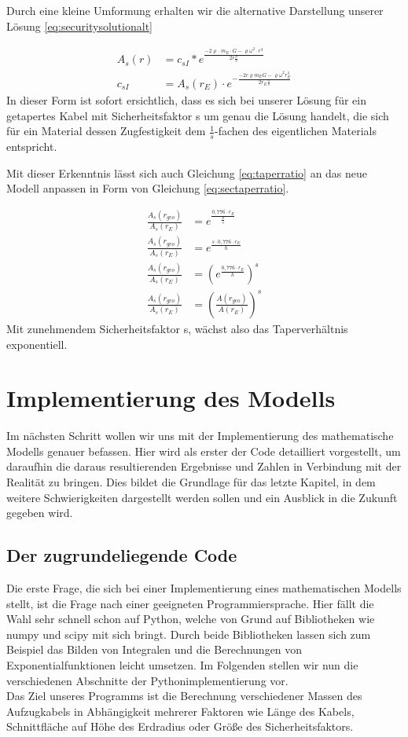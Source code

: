 \documentclass[a4paper, 10pt]{report}
\begin{document}
Durch eine kleine Umformung erhalten wir die alternative Darstellung unserer Lösung \ref{eq:securitysolutionalt}

\begin{align}
A_s(r) &= c_{sI} * e^{\frac{-2\varrho \cdot m_E \cdot G - \varrho \omega^2 \cdot r^3}{2 r \frac{\sigma}{s}}}\label{eq:securitysolutionalt}\\
c_{sI} &= A_s(r_E) \cdot e^{- \frac{-2 c \varrho m_E G - \varrho \omega^2 r_E^3}{2 r_E \frac{\sigma}{s}}}
\label{eq:securityconstantalt}
\end{align}
In dieser Form ist sofort ersichtlich, dass es sich bei unserer Lösung für ein getapertes Kabel mit Sicherheitsfaktor s um genau die Lösung handelt, die sich für ein Material dessen Zugfestigkeit dem $\frac{1}{s}$-fachen des eigentlichen Materials entspricht.

Mit dieser Erkenntnis lässt sich auch Gleichung \ref{eq:taperratio} an das neue Modell anpassen in Form von Gleichung \ref{eq:sectaperratio}.

\begin{align}
\frac{A_s(r_{geo})}{A_s(r_E)} &= e^\frac{0,776 \cdot r_E}{\frac{h}{s}} \nonumber\\
\frac{A_s(r_{geo})}{A_s(r_E)} &= e^\frac{s \cdot 0,776 \cdot r_E}{h} \nonumber\\
\frac{A_s(r_{geo})}{A_s(r_E)} &= (e^\frac{0,776 \cdot r_E}{h})^s \nonumber\\
\frac{A_s(r_{geo})}{A_s(r_E)} &= (\frac{A(r_{geo})}{A(r_E)})^s
\label{eq:sectaperratio}
\end{align}
Mit zunehmendem Sicherheitsfaktor s, wächst also das Taperverhältnis exponentiell.

\chapter{Implementierung des Modells}
Im nächsten Schritt wollen wir uns mit der Implementierung des mathematische Modells genauer befassen. Hier wird als erster der Code detailliert vorgestellt, um daraufhin die daraus resultierenden Ergebnisse und Zahlen in Verbindung mit der Realität zu bringen. Dies bildet die Grundlage für das letzte Kapitel, in dem weitere Schwierigkeiten dargestellt werden sollen und ein Ausblick in die Zukunft gegeben wird.
\section{Der zugrundeliegende Code}
Die erste Frage, die sich bei einer Implementierung eines mathematischen Modells stellt, ist die Frage nach einer geeigneten Programmiersprache. Hier fällt die Wahl sehr schnell schon auf Python, welche von Grund auf Bibliotheken wie numpy und scipy mit sich bringt. Durch beide Bibliotheken lassen sich zum Beispiel das Bilden von Integralen und die Berechnungen von Exponentialfunktionen leicht umsetzen. 
Im Folgenden stellen wir nun die verschiedenen Abschnitte der Pythonimplementierung vor.\\
Das Ziel unseres Programms ist die Berechnung verschiedener Massen des Aufzugkabels in Abhängigkeit mehrerer Faktoren wie Länge des Kabels, Schnittfläche auf Höhe des Erdradius oder Größe des Sicherheitsfaktors.
 
\end{document}
